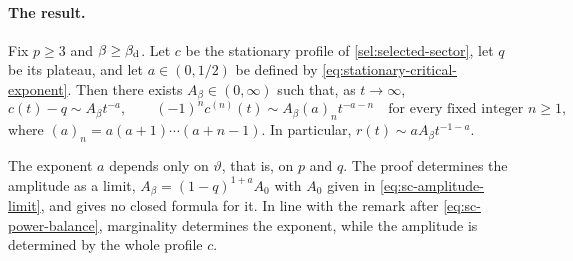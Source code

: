 \paragraph{The result.}

\begin{theorem}
\label{thm:stationary-critical-amplitude}
Fix $p\ge3$ and $\beta\ge\beta_{\mathrm d}$. Let $c$ be the stationary profile of \cref{sel:selected-sector}, let $q$ be its plateau, and let $a\in(0,1/2)$ be defined by \eqref{eq:stationary-critical-exponent}. Then there exists $A_\beta\in(0,\infty)$ such that, as $t\to\infty$,
\begin{equation}
 c(t)-q\sim A_\beta t^{-a},\qquad
 (-1)^n c^{(n)}(t)\sim A_\beta(a)_n t^{-a-n}
 \quad\text{for every fixed integer }n\ge1,
 \label{eq:stationary-critical-amplitude}
\end{equation}
where $(a)_n=a(a+1)\cdots(a+n-1)$. In particular, $r(t)\sim aA_\beta t^{-1-a}$.
\end{theorem}

\begin{remark}\label{rem:sc-amplitude}
The exponent $a$ depends only on $\vartheta$, that is, on $p$ and $q$. The proof determines the amplitude as a limit, $A_\beta=(1-q)^{1+a}A_0$ with $A_0$ given in \eqref{eq:sc-amplitude-limit}, and gives no closed formula for it. In line with the remark after \eqref{eq:sc-power-balance}, marginality determines the exponent, while the amplitude is determined by the whole profile $c$.
\end{remark}

